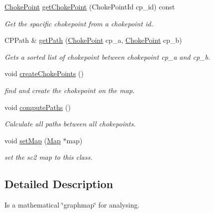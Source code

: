 \begin{DoxyCompactItemize}
\hyperlink{classOverseer_1_1ChokePoint}{Choke\+Point} \hyperlink{classOverseer_1_1Graph_a5d31f9158cc08a492c88976aabe83622}{get\+Choke\+Point} (Choke\+Point\+Id cp\+\_\+id) const
\begin{DoxyCompactList}\small\item\em Get the spacific chokepoint from a chokepoint id. \end{DoxyCompactList}\item 
C\+P\+Path \& \hyperlink{classOverseer_1_1Graph_a3e1625adca63c0446193612b1a0e41e7}{get\+Path} (\hyperlink{classOverseer_1_1ChokePoint}{Choke\+Point} cp\+\_\+a, \hyperlink{classOverseer_1_1ChokePoint}{Choke\+Point} cp\+\_\+b)
\begin{DoxyCompactList}\small\item\em Gets a sorted list of chokepoint between chokepoint cp\+\_\+a and cp\+\_\+b. \end{DoxyCompactList}\item 
\mbox{\label{classOverseer_1_1Graph_ad5adfa0b535ffc46ad85d26119e6d89b}} 
void \hyperlink{classOverseer_1_1Graph_ad5adfa0b535ffc46ad85d26119e6d89b}{create\+Choke\+Points} ()
\begin{DoxyCompactList}\small\item\em find and create the chokepoint on the map. \end{DoxyCompactList}\item 
\mbox{\label{classOverseer_1_1Graph_a5149ac86dd295cda3f966b22b75a5932}} 
void \hyperlink{classOverseer_1_1Graph_a5149ac86dd295cda3f966b22b75a5932}{compute\+Paths} ()
\begin{DoxyCompactList}\small\item\em Calculate all paths between all chokepoints. \end{DoxyCompactList}\item 
void \hyperlink{classOverseer_1_1Graph_ad515783d1196207bc2c34637f421b593}{set\+Map} (\hyperlink{classOverseer_1_1Map}{Map} $\ast$map)
\begin{DoxyCompactList}\small\item\em set the sc2 map to this class. \end{DoxyCompactList}\end{DoxyCompactItemize}


\subsection{Detailed Description}
Is a mathematical \char`\"{}graphmap\char`\"{} for analysing. 

